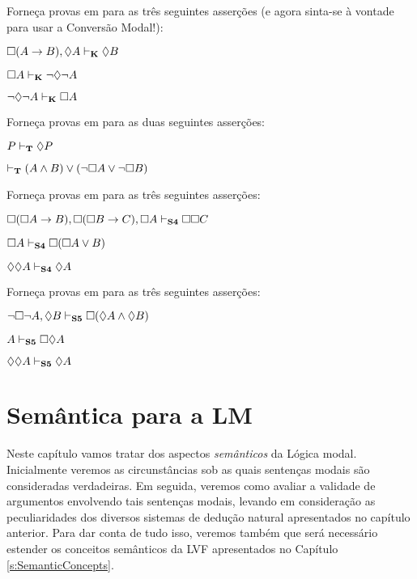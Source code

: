 \problempart
Forneça provas  em \mlK{}  para as três seguintes asserções (e agora sinta-se à vontade para usar a Conversão Modal!):
\begin{earg}
	\item $\Box(A\rightarrow B), \Diamond A \vdash_{\mathbf{K}} \Diamond B$
	\item $\Box A \vdash_{\mathbf{K}} \neg\Diamond\neg A$
	\item $\neg\Diamond\neg A \vdash_{\mathbf{K}} \Box A$
\end{earg}

\problempart
Forneça provas em  \mlT{} para as duas seguintes asserções:
\begin{earg}
	\item $P\vdash_{\mathbf{T}}\Diamond P$
	\item $\vdash_{\mathbf{T}} (A\wedge B)\vee(\neg \Box A\vee\neg\Box B)$
\end{earg}

\problempart
Forneça provas em  \mlSfour{}  para as três seguintes asserções:
\begin{earg}
	\item $\Box(\Box A\rightarrow B), \Box (\Box B\rightarrow C), \Box A \vdash_{\mathbf{S4}} \Box\Box C$
	\item $\Box A \vdash_{\mathbf{S4}} \Box(\Box A \vee B)$
	\item $\Diamond \Diamond A \vdash_{\mathbf{S4}} \Diamond A$
\end{earg}

\problempart
Forneça provas em \mlSfive{} para as três seguintes asserções:
\begin{earg}
	\item $\neg\Box\neg A, \Diamond B\vdash_{\mathbf{S5}} \Box(\Diamond A \wedge \Diamond B)$
	\item $A \vdash_{\mathbf{S5}}  \Box\Diamond A$
	\item $\Diamond\Diamond A\vdash_{\mathbf{S5}}  \Diamond A$
\end{earg}

\chapter{Semântica para  a  LM}
\label{Semantics}

Neste capítulo vamos tratar dos aspectos \emph{semânticos} da Lógica modal.  Inicialmente veremos as circunstâncias sob as quais sentenças modais são consideradas verdadeiras. Em seguida, veremos como avaliar a validade de argumentos envolvendo tais sentenças modais, levando em consideração as peculiaridades dos diversos sistemas  de  dedução natural  apresentados no capítulo anterior. Para dar conta de tudo isso, veremos também  que será necessário  estender os conceitos semânticos da LVF apresentados no Capítulo \ref{s:SemanticConcepts}. 

